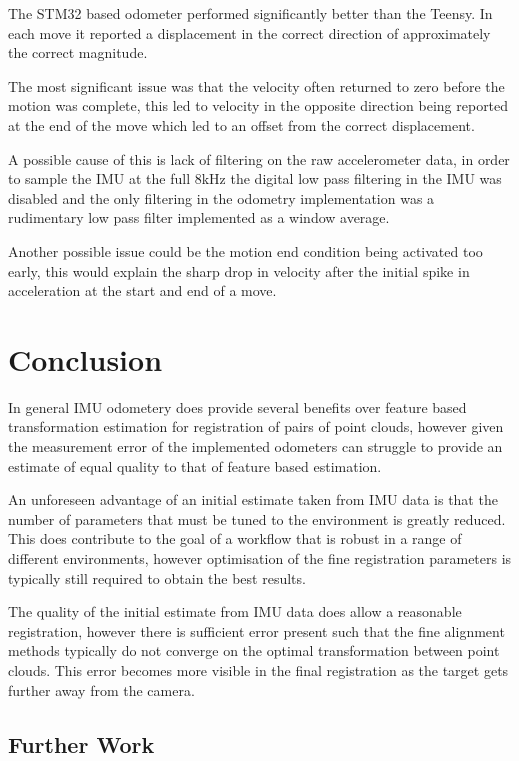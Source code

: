 \documentclass{entcs}
\begin{document}
The STM32 based odometer performed significantly better than the Teensy. In each
move it reported a displacement in the correct direction of approximately the
correct magnitude.

The most significant issue was that the velocity often returned to zero before
the motion was complete, this led to velocity in the opposite direction being
reported at the end of the move which led to an offset from the correct
displacement.

A possible cause of this is lack of filtering on the raw accelerometer data, in
order to sample the IMU at the full 8kHz the digital low pass filtering in the
IMU was disabled and the only filtering in the odometry implementation was a
rudimentary low pass filter implemented as a window average.

Another possible issue could be the motion end condition being activated too
early, this would explain the sharp drop in velocity after the initial spike in
acceleration at the start and end of a move.

\section{Conclusion}

In general IMU odometery does provide several benefits over feature based
transformation estimation for registration of pairs of point clouds, however
given the measurement error of the implemented odometers can struggle to
provide an estimate of equal quality to that of feature based estimation.

An unforeseen advantage of an initial estimate taken from IMU data is that the
number of parameters that must be tuned to the environment is greatly reduced.
This does contribute to the goal of a workflow that is robust in a range of
different environments, however optimisation of the fine registration parameters
is typically still required to obtain the best results.

The quality of the initial estimate from IMU data does allow a reasonable
registration, however there is sufficient error present such that the fine
alignment methods typically do not converge on the optimal transformation
between point clouds. This error becomes more visible in the final registration
as the target gets further away from the camera.

\subsection{Further Work}
\end{document}
